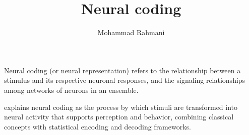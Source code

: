 \documentclass[a4paper]{article}
\title{Neural coding}
\date{}
\author{Mohammad Rahmani}
\begin{document}
    \maketitle
    Neural coding (or neural representation) refers to the relationship between a stimulus and its respective neuronal responses, and the signaling relationships among networks of neurons in an ensemble. 
    
    \cite{shimazaki-2025-neural-coding-foundational-concepts-statistical-formulations-and-recent-advances} explains neural coding as the process by which stimuli are transformed into neural activity that supports perception and behavior, combining classical concepts with statistical encoding and decoding frameworks.
    
    
\end{document}
